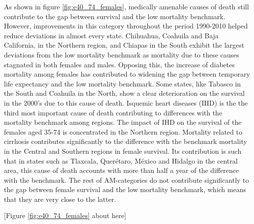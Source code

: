 \documentclass[11.5pt]{article}
\begin{document}
\begin{spacing}{1.5}
As shown in figure \ref{fig:e40_74_females}, medically amenable causes of death still contribute to the gap between survival and the low mortality benchmark. However, improvements in this category throughout the period 1990-2010 helped reduce deviations in almost every state. Chihuahua, Coahuila and Baja California, in the Northern region, and Chiapas in the South exhibit the largest deviations from the low mortality benchmark as mortality due to these causes stagnated in both females and males. Opposing this, the increase of diabetes mortality among females has contributed to widening the gap between temporary life expectancy and the low mortality benchmark. Some states, like Tabasco in the South and Coahuila in the North, show a clear deterioration on the survival in the 2000's due to this cause of death. Isquemic heart diseases (IHD) is the the third most important cause of death contributing to differences with the mortality benchmark among regions. The impact of IHD on the survival of the females aged 35-74 is concentrated in the Northern region. Mortality related to cirrhosis contributes significantly to the difference with the benchmark mortality in the Central and Southern regions in female survival. Its contribution is such that in states such as Tlaxcala, Quer\'etaro, M\'exico and Hidalgo in the central area, this cause of death accounts with more than half a year of the difference with the benchmark. The rest of AM-categories do not contribute significantly to the gap between female survival and the low mortality benchmark, which means that they are very close to the latter.\\

\begin{center}
[Figure \ref{fig:e40_74_females} about here]
\end{center}



\end{spacing}
\end{document}
